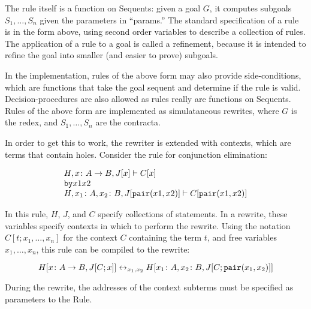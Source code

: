 \documentclass{article}
\begin{document}
The rule itself is a function on Sequents: given a goal $G$, it computes subgoals $S_1, \ldots, S_n$
given the parameters in ``params.'' The standard specification of a rule is in the form above, using
second order variables to describe a collection of rules. The application of a rule to a goal is
called a refinement, because it is intended to refine the goal into smaller (and easier to prove)
subgoals.

In the implementation, rules of the above form may also provide side-conditions, which are functions
that take the goal sequent and determine if the rule is valid.  Decision-procedures are also 
allowed as rules really are functions on Sequents.  Rules of the above form are implemented as 
simulataneous rewrites, where $G$ is the redex, and $S_1, \ldots, S_n$ are the contracta.

In order to get this to work, the rewriter is extended with contexts, which are terms that contain 
holes.  Consider the rule for conjunction elimination:

$$
\begin{array}{l}
H, x\colon A \rightarrow B, J[x] \vdash C[x]\\
{\tt by} x1 x2\\
H, x_1\colon A, x_2\colon B, J[{\tt pair}(x1,x2)] \vdash C[{\tt pair}(x1,x2)]
\end{array}
$$

In this rule, $H$, $J$, and $C$ specify collections of statements. In a rewrite, these variables
specify contexts in which to perform the rewrite.  Using the notation $C[t; x_1, \ldots, x_n]$ for
the context $C$ containing the term $t$, and free variables $x_1, \ldots, x_n$, this rule can be
compiled to the rewrite:

$$ H[x\colon A \rightarrow B, J[C; x]] \leftrightarrow_{x_1, x_2} H[x_1\colon A, x_2\colon B, J[C;
{\tt pair}(x_1,x_2)]]
$$

During the rewrite, the addresses of the context subterms must be specified as parameters to the 
Rule.
\end{document}
